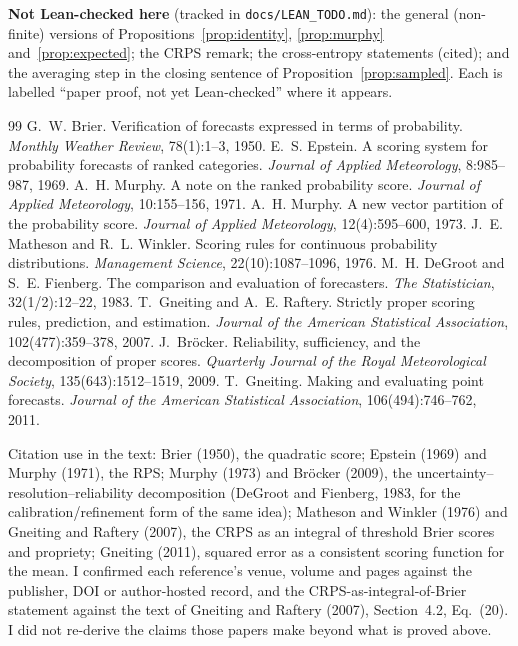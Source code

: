 \documentclass[11pt]{article}
\theoremstyle{remark}
\theoremstyle{definition}
\newcommand{\1}{\mathbf{1}}
\newcommand{\file}[1]{\nolinkurl{#1}}
\begin{document}
\textbf{Not Lean-checked here} (tracked in \file{docs/LEAN_TODO.md}): the general (non-finite) versions of Propositions~\ref{prop:identity}, \ref{prop:murphy} and~\ref{prop:expected}; the CRPS remark; the cross-entropy statements (cited); and the averaging step in the closing sentence of Proposition~\ref{prop:sampled}. Each is labelled ``paper proof, not yet Lean-checked'' where it appears.

\begin{thebibliography}{99}\small
{} G.~W. Brier. Verification of forecasts expressed in terms of probability. \emph{Monthly Weather Review}, 78(1):1--3, 1950.
 E.~S. Epstein. A scoring system for probability forecasts of ranked categories. \emph{Journal of Applied Meteorology}, 8:985--987, 1969.
 A.~H. Murphy. A note on the ranked probability score. \emph{Journal of Applied Meteorology}, 10:155--156, 1971.
 A.~H. Murphy. A new vector partition of the probability score. \emph{Journal of Applied Meteorology}, 12(4):595--600, 1973.
 J.~E. Matheson and R.~L. Winkler. Scoring rules for continuous probability distributions. \emph{Management Science}, 22(10):1087--1096, 1976.
 M.~H. DeGroot and S.~E. Fienberg. The comparison and evaluation of forecasters. \emph{The Statistician}, 32(1/2):12--22, 1983.
 T.~Gneiting and A.~E. Raftery. Strictly proper scoring rules, prediction, and estimation. \emph{Journal of the American Statistical Association}, 102(477):359--378, 2007.
 J.~Br\"ocker. Reliability, sufficiency, and the decomposition of proper scores. \emph{Quarterly Journal of the Royal Meteorological Society}, 135(643):1512--1519, 2009.
 T.~Gneiting. Making and evaluating point forecasts. \emph{Journal of the American Statistical Association}, 106(494):746--762, 2011.
\end{thebibliography}

Citation use in the text: Brier (1950), the quadratic score; Epstein (1969) and Murphy (1971), the RPS; Murphy (1973) and Br\"ocker (2009), the uncertainty--resolution--reliability decomposition (DeGroot and Fienberg, 1983, for the calibration/refinement form of the same idea); Matheson and Winkler (1976) and Gneiting and Raftery (2007), the CRPS as an integral of threshold Brier scores and propriety; Gneiting (2011), squared error as a consistent scoring function for the mean. I confirmed each reference's venue, volume and pages against the publisher, DOI or author-hosted record, and the CRPS-as-integral-of-Brier statement against the text of Gneiting and Raftery (2007), Section~4.2, Eq.~(20). I did not re-derive the claims those papers make beyond what is proved above.
\end{document}
